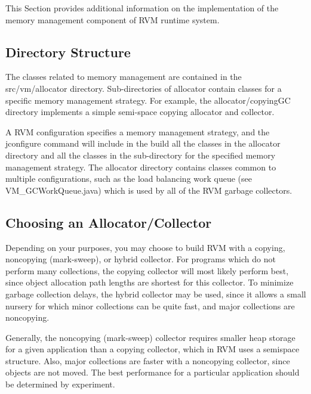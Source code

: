 This Section provides additional information on the implementation
of the memory management component of RVM runtime system.
 
\subsection{Directory Structure} \label{sssec:directories}
The classes related to memory management are contained in the 
src/vm/allocator directory.  Sub-directories of allocator 
contain classes for a specific memory management strategy.
For example, the allocator/copyingGC directory implements a
simple semi-space copying allocator and collector.

A RVM configuration specifies a memory management strategy, 
and the jconfigure command will include in the build all the
classes in the allocator directory and all the classes in the
sub-directory for the specified memory management strategy.
The allocator directory contains classes common to multiple
configurations, such as the load balancing work queue (see
VM\_GCWorkQueue.java) which is used by all of the RVM
garbage collectors.

\subsection{Choosing an Allocator/Collector} \label{sssec:choosinggc}
Depending on your purposes, you may choose to build RVM
with a copying, noncopying (mark-sweep), or hybrid collector.
For programs which do not perform many collections, the
copying collector will most likely perform best, since object
allocation path lengths are shortest for this collector.  To
minimize garbage collection delays, the hybrid collector may
be used, since it allows a small nursery for which minor collections
can be quite fast, and major collections are noncopying.  

Generally, the noncopying (mark-sweep)
collector requires smaller heap storage for a given application	
than a copying collector, which in RVM uses a semispace structure.
Also, major collections are faster with a noncopying collector,
since objects are not moved.  The best performance for a particular	
application should be determined by experiment.

